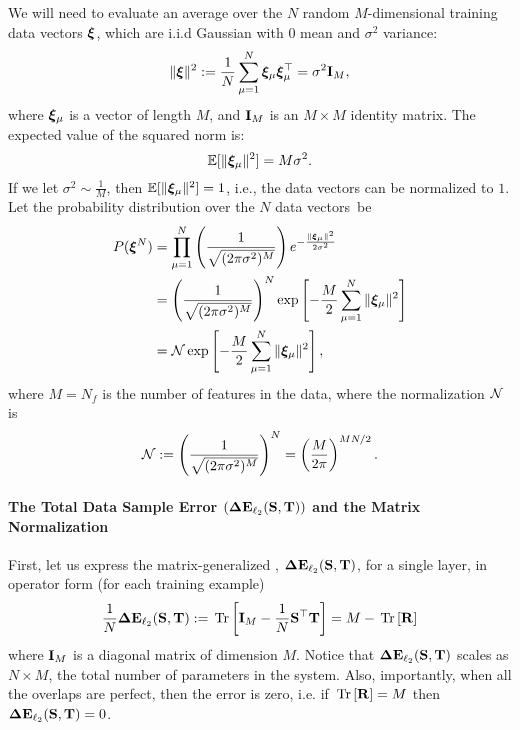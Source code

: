 We will need to evaluate an average over the $N$ random $M$-dimensional training data vectors $\boldsymbol{\xi}$,
which are i.i.d Gaussian with $0$ mean and $\sigma^{2}$ variance:
\begin{equation}
  \label{eqn:XInorm}
  \Vert \boldsymbol{\xi} \Vert^2 :=\frac{1}{N} \sum_{\mu=1}^{N} \boldsymbol{\xi}_\mu \boldsymbol{\xi}_\mu^{\top} = \sigma^{2}\mathbf{I}_{M} ,
\end{equation}
where $\boldsymbol{\xi}_{\mu}$ is a vector of length $M$, and $\mathbf{I}_{M}$ is an $M \times M$ identity matrix.
%
The expected value of the squared norm is:
\begin{equation}
\mathbb{E}[\Vert \boldsymbol{\xi}_{\mu} \Vert^2] = M \sigma^2 .
\end{equation}
If we let $\sigma^{2}\sim\tfrac{1}{M}$, 
then $\mathbb{E}[\Vert \boldsymbol{\xi}_{\mu} \Vert^2]=1$, i.e., the data vectors can be normalized to $1$.
%
Let the probability distribution over the $N$ data vectors~be
\begin{align}
\nonumber
  P(\boldsymbol{\xi}^{N}) &= \prod_{\mu=1}^{N} \left( \frac{1}{\sqrt{(2 \pi \sigma^2)^M}} \right) e^{-\frac{\|\boldsymbol{\xi}_{\mu}\|^2}{2 \sigma^2}} \\ 
\nonumber
  &= \left( \frac{1}{\sqrt{(2 \pi \sigma^2)^M}} \right)^{N} \exp\left[-\frac{M}{2}\sum_{\mu=1}^{N}\|\boldsymbol{\xi}_{\mu}\|^2\right] \\ 
  \label{eqn:pndx_vec}
  &= \mathcal{N} \exp\left[-\frac{M}{2}\sum_{\mu=1}^{N}\|\boldsymbol{\xi}_{\mu}\|^2\right] ,
\end{align}
where $M=N_f$ is  the number of features in the data, where the normalization $\mathcal{N}$ is
\begin{align}
\label{eqn:xinorm}
\mathcal{N} 
:=\left( \frac{1}{\sqrt{(2 \pi \sigma^2)^M}} \right)^{N}
 =\left( \frac{M}{2\pi} \right)^{MN/2} .
\end{align}

\paragraph{The Total Data Sample Error $(\mathbf{\Delta {E}}_{\ell_2}({\mathbf{S}},{\mathbf{T}}))$ and the Matrix Normalization}
First, let us express the matrix-generalized \TotalDataSampleError, $\mathbf{\Delta {E}}_{\ell_2}({\mathbf{S}},{\mathbf{T}})$, for a single layer,
in operator form (for each training example)
\begin{align}
 \label{eqn:DETOPST}
 \frac{1}{N}\mathbf{\Delta {E}}_{\ell_2}({\mathbf{S}},{\mathbf{T}})  := \mbox{}\operatorname{Tr}\left[\mathbf{I}_{M} - \frac{1}{N}{\mathbf{S}}^{\top}{\mathbf{T}}\right] = M - \mbox{}\operatorname{Tr}\left[\mathbf{R}\right]
\end{align}
where $\mathbf{I}_{M}$ is a diagonal matrix of dimension $M$.
Notice that $\mathbf{\Delta {E}}_{\ell_2}({\mathbf{S}},{\mathbf{T}})$ scales as $N\times M$, the total number of parameters in the system.
Also,  importantly, when all the overlaps are perfect, then the error is zero, i.e. if $\mbox{}\operatorname{Tr}\left[\mathbf{R}\right]=M$ then $\mathbf{\Delta {E}}_{\ell_2}({\mathbf{S}},{\mathbf{T}})=0$.
                                                                        
